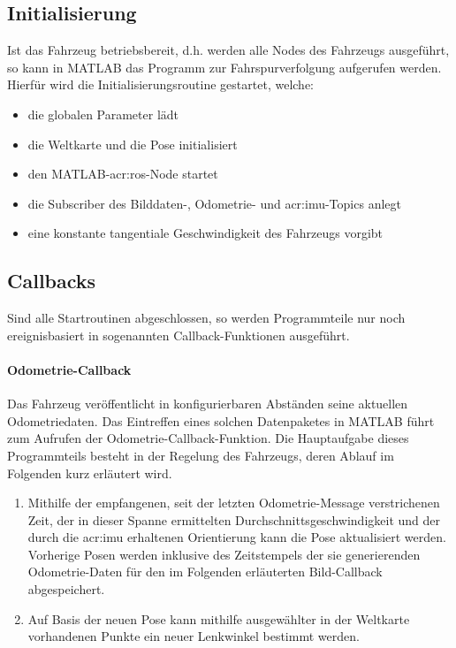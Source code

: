 \subsection{Initialisierung}
Ist das Fahrzeug betriebsbereit, d.h. werden alle Nodes des Fahrzeugs ausgeführt, so kann in MATLAB das Programm zur Fahrspurverfolgung aufgerufen werden. Hierfür wird die Initialisierungsroutine gestartet, welche:
\begin{itemize}
\item die globalen Parameter lädt
\item die Weltkarte und die Pose initialisiert
\item den MATLAB-\gls{acr:ros}-Node startet
\item die Subscriber des Bilddaten-, Odometrie- und \gls{acr:imu}-Topics anlegt
\item eine konstante tangentiale Geschwindigkeit des Fahrzeugs vorgibt 
\end{itemize}

\subsection{Callbacks}
\label{ssec:software_struktur:matlab:callbacks}
Sind alle Startroutinen abgeschlossen, so werden Programmteile nur noch ereignisbasiert in sogenannten Callback-Funktionen ausgeführt.
 
\paragraph{Odometrie-Callback}
Das Fahrzeug veröffentlicht in konfigurierbaren Abständen seine aktuellen Odometriedaten.
Das Eintreffen eines solchen Datenpaketes in MATLAB führt zum Aufrufen der Odometrie-Callback-Funktion. Die Hauptaufgabe dieses Programmteils besteht in der Regelung des Fahrzeugs, deren Ablauf im Folgenden kurz erläutert wird.
\begin{enumerate}
\item Mithilfe der empfangenen, seit der letzten Odometrie-Message verstrichenen Zeit, der in dieser Spanne ermittelten Durchschnittsgeschwindigkeit und der durch die \gls{acr:imu} erhaltenen Orientierung kann die Pose aktualisiert werden. Vorherige Posen werden inklusive des Zeitstempels der sie generierenden Odometrie-Daten für den im Folgenden erläuterten Bild-Callback abgespeichert.
\item Auf Basis der neuen Pose kann mithilfe ausgewählter in der Weltkarte vorhandenen Punkte ein neuer Lenkwinkel bestimmt werden.
\end{enumerate}
